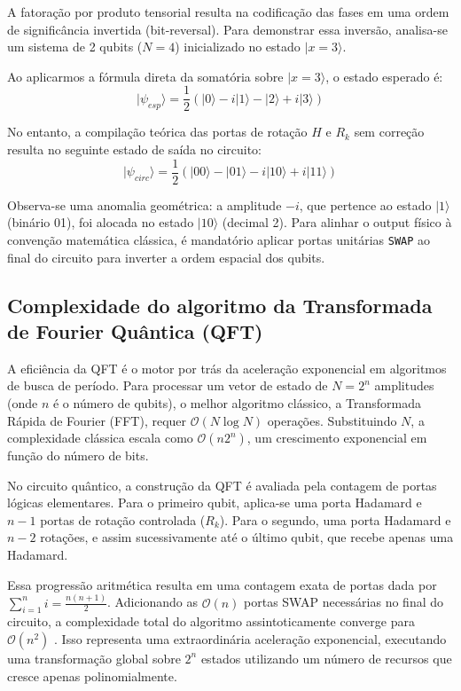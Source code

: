 \documentclass[12pt, a4paper]{article}
\newcommand{\ket}[1]{\lvert #1 \rangle}
\begin{document}
A fatoração por produto tensorial resulta na codificação das fases em uma ordem de significância invertida (bit-reversal). Para demonstrar essa inversão, analisa-se um sistema de 2 qubits ($N=4$) inicializado no estado $\ket{x=3}$.

Ao aplicarmos a fórmula direta da somatória sobre $\ket{x=3}$, o estado esperado é:
\begin{equation}
    \ket{\psi_{esp}} = \frac{1}{2}\left( \ket{0} - i\ket{1} - \ket{2} + i\ket{3} \right)
\end{equation}

No entanto, a compilação teórica das portas de rotação $H$ e $R_k$ sem correção resulta no seguinte estado de saída no circuito:
\begin{equation}
    \ket{\psi_{circ}} = \frac{1}{2}\left( \ket{00} - \ket{01} - i\ket{10} + i\ket{11} \right)
\end{equation}

Observa-se uma anomalia geométrica: a amplitude $-i$, que pertence ao estado $\ket{1}$ (binário 01), foi alocada no estado $\ket{10}$ (decimal 2). Para alinhar o output físico à convenção matemática clássica, é mandatório aplicar portas unitárias \texttt{SWAP} ao final do circuito para inverter a ordem espacial dos qubits.

\subsection{Complexidade do algoritmo da Transformada de Fourier Quântica (QFT)}

A eficiência da QFT é o motor por trás da aceleração exponencial em algoritmos de busca de período. Para processar um vetor de estado de $N = 2^n$ amplitudes (onde $n$ é o número de qubits), o melhor algoritmo clássico, a Transformada Rápida de Fourier (FFT), requer $\mathcal{O}(N \log N)$ operações. Substituindo $N$, a complexidade clássica escala como $\mathcal{O} (n 2^n)$, um crescimento exponencial em função do número de bits.

No circuito quântico, a construção da QFT é avaliada pela contagem de portas lógicas elementares. Para o primeiro qubit, aplica-se uma porta Hadamard e $n - 1$ portas de rotação controlada ($R_k$). Para o segundo, uma porta Hadamard e $n-2$ rotações, e assim sucessivamente até o último qubit, que recebe apenas uma Hadamard.

Essa progressão aritmética resulta em uma contagem exata de portas dada por $\sum_{i=1}^{n} i = \frac{n(n+1)}{2}$. Adicionando as $\mathcal{O}(n)$ portas SWAP necessárias no final do circuito, a complexidade total do algoritmo assintoticamente converge para $\mathcal{O}(n^2)$ \cite{nielsen2010}. Isso representa uma extraordinária aceleração exponencial, executando uma transformação global sobre $2^n$ estados utilizando um número de recursos que cresce apenas polinomialmente.
\end{document}
